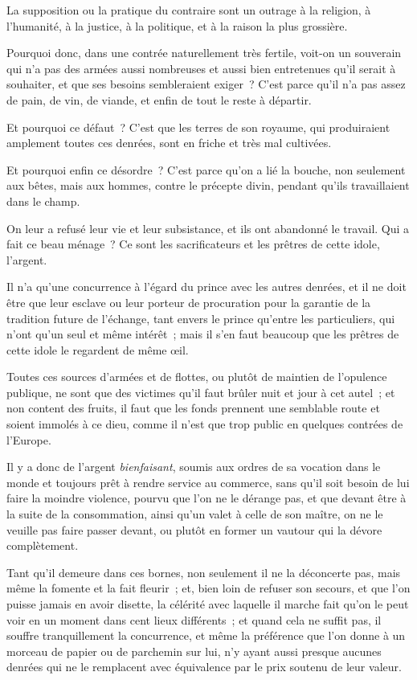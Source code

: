 \documentclass[french,twoside]{book} %
\begin{document}
La supposition ou la pratique du contraire sont un outrage à la religion, à l’humanité, à la justice, à la politique, et à la raison la plus grossière.\par
Pourquoi donc, dans une contrée naturellement très fertile, voit-on un souverain qui n’a pas des armées aussi nombreuses et aussi bien entretenues qu’il serait à souhaiter, et que ses besoins sembleraient exiger ? C’est parce qu’il n’a pas assez de pain, de vin, de viande, et enfin de tout le reste à départir.\par
Et pourquoi ce défaut ? C’est que les terres de son royaume, qui produiraient amplement toutes ces denrées, sont en friche et très mal cultivées.\par
Et pourquoi enfin ce désordre ? C’est parce qu’on a lié la bouche, non seulement aux bêtes, mais aux hommes, contre le précepte divin, pendant qu’ils travaillaient dans le champ.\par
On leur a refusé leur vie et leur subsistance, et ils ont abandonné le travail. Qui a fait ce beau ménage ? Ce sont les sacrificateurs et les prêtres de cette idole, l’argent.\par
Il n’a qu’une concurrence à l’égard du prince avec les autres denrées, et il ne doit être que leur esclave ou leur porteur de procuration pour la garantie de la tradition future de l’échange, tant envers le prince qu’entre les particuliers, qui n’ont qu’un seul et même intérêt ; mais il s’en faut beaucoup que les prêtres de cette idole le regardent de même œil.\par
Toutes ces sources d’armées et de flottes, ou plutôt de maintien de l’opulence publique, ne sont que des victimes qu’il faut brûler nuit et jour à cet autel ; et non content des fruits, il faut que les fonds prennent une semblable route et soient immolés à ce dieu, comme il n’est que trop public en quelques contrées de l’Europe.\par
Il y a donc de l’argent {\itshape bienfaisant}, soumis aux ordres de sa vocation dans le monde et toujours prêt à rendre service au commerce, sans qu’il soit besoin de lui faire la moindre violence, pourvu que l’on ne le dérange pas, et que devant être à la suite de la consommation, ainsi qu’un valet à celle de son maître, on ne le veuille pas faire passer devant, ou plutôt en former un vautour qui la dévore complètement.\par
Tant qu’il demeure dans ces bornes, non seulement il ne la déconcerte pas, mais même la fomente et la fait fleurir ; et, bien loin de refuser son secours, et que l’on puisse jamais en avoir disette, la célérité avec laquelle il marche fait qu’on le peut voir en un moment dans cent lieux différents ; et quand cela ne suffit pas, il souffre tranquillement la concurrence, et même la préférence que l’on donne à un morceau de papier ou de parchemin sur lui, n’y ayant aussi presque aucunes denrées qui ne le remplacent avec équivalence par le prix soutenu de leur valeur.\par
\end{document}
